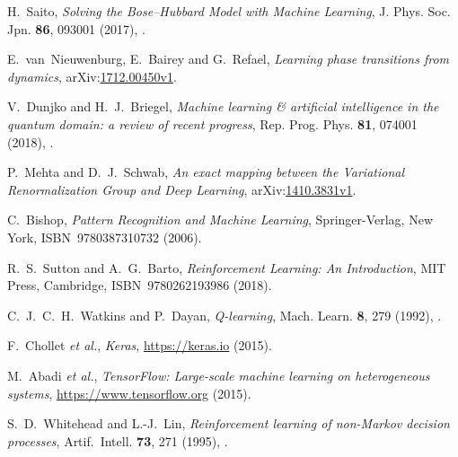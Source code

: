 \documentclass[11pt, a4paper]{report} %
\begin{document}
\begin{thebibliography}{99}
H.~Saito, \textit{Solving the Bose–Hubbard Model with Machine Learning}, J. Phys. Soc. Jpn. \textbf{86}, 093001 (2017), .




E.~van~Nieuwenburg, E.~Bairey and G.~Refael, \textit{Learning phase transitions from dynamics}, arXiv:\href{https://arxiv.org/abs/1712.00450v1}{1712.00450v1}.




V.~Dunjko and H.~J.~Briegel, \textit{Machine learning \& artificial intelligence in the quantum domain: a review of recent progress}, Rep. Prog. Phys. \textbf{81}, 074001 (2018), .



P.~Mehta and D.~J.~Schwab, \textit{An exact mapping between the Variational Renormalization Group and Deep Learning}, arXiv:\href{https://arxiv.org/abs/1410.3831v1}{1410.3831v1}. 




C.~Bishop, \emph{Pattern Recognition and Machine Learning}, Springer-Verlag, New York, ISBN~9780387310732 (2006).


R.~S.~Sutton and A.~G.~Barto, \emph{Reinforcement Learning: An Introduction}, MIT Press, Cambridge, ISBN~9780262193986 (2018).




C.~J.~C.~H.~Watkins and P.~Dayan, \textit{Q-learning}, Mach. Learn. \textbf{8}, 279 (1992), .




F.~Chollet \textit{et al.}, \emph{Keras}, \href{https://keras.io}{https://keras.io} (2015).





M.~Abadi \textit{et al.}, \emph{{TensorFlow}: Large-scale machine learning on heterogeneous systems}, \href{https://www.tensorflow.org}{https://www.tensorflow.org} (2015).





S.~D.~Whitehead and L.-J.~Lin, \textit{Reinforcement learning of non-Markov decision processes}, Artif.~Intell. \textbf{73}, 271 (1995), .





\end{thebibliography}
\end{document}
